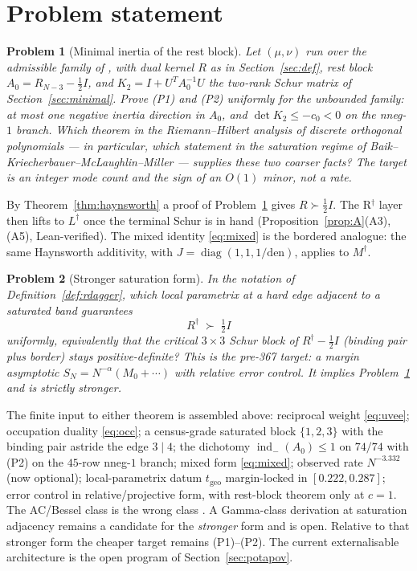 \documentclass[11pt]{article}
\newtheorem{problem}{Problem}
\theoremstyle{remark}
\newcommand{\Rd}{R^{\dagger}}
\newcommand{\Ld}{L^{\dagger}}
\newcommand{\half}{\tfrac12}
\begin{document}
\section{Problem statement}\label{sec:problem}

\begin{problem}[Minimal inertia of the rest block]
\label{prob:minimal}
Let $(\mu,\nu)$ run over the admissible family of
\cite{lstar-note}, with dual kernel $R$ as in
Section~\ref{sec:def}, rest block $A_{0}=R_{N-3}-\half I$, and
$K_{2}=I+U^{T}A_{0}^{-1}U$ the two-rank Schur matrix of
Section~\ref{sec:minimal}.  Prove \textup{(P1)} and \textup{(P2)}
uniformly for the unbounded family: at most one negative inertia
direction in $A_{0}$, and $\det K_{2}\le -c_{0}<0$ on the
nneg-$1$ branch.  Which theorem in the Riemann--Hilbert analysis
of discrete orthogonal polynomials --- in particular, which
statement in the saturation regime of
Baik--Kriecherbauer--McLaughlin--Miller
\emph{\cite[Thm~2.7, Remark~2.8]{BKMM2007}} --- supplies these two
coarser facts?  The target is an integer mode count and the sign
of an $O(1)$ minor, not a rate.
\end{problem}

By Theorem~\ref{thm:haynsworth} a proof of
Problem~\ref{prob:minimal} gives $R\succ\half I$.  The R$^{\dagger}$
layer then lifts to $\Ld$ once the terminal Schur is in hand
(Proposition~\ref{prop:A}(A3),(A5), Lean-verified).  The mixed
identity \eqref{eq:mixed} is the bordered analogue: the same
Haynsworth additivity, with $J=\operatorname{diag}(1,1,1/\mathrm{den})$,
applies to $M^{\dagger}$.

\begin{problem}[Stronger saturation form]
\label{prob:rhp}
In the notation of Definition~\ref{def:rdagger}, which local
parametrix at a hard edge adjacent to a saturated band guarantees
\begin{equation}\label{eq:target}
\Rd\;\succ\;\half I
\end{equation}
uniformly, equivalently that the critical $3\times3$ Schur block
of $\Rd-\half I$ (binding pair plus border) stays
positive-definite?  This is the pre-367 target: a margin
asymptotic $S_{N}=N^{-\alpha}(M_{0}+\cdots)$ with relative error
control.  It implies Problem~\ref{prob:minimal} and is strictly
stronger.
\end{problem}

The finite input to either theorem is assembled above: reciprocal
weight \eqref{eq:uvee}; occupation duality \eqref{eq:occ}; a
census-grade saturated block $\{1,2,3\}$ with the binding pair
astride the edge $3\mid4$; the dichotomy
$\operatorname{ind}_{-}(A_{0})\le1$ on $74/74$ with (P2) on the
$45$-row nneg-$1$ branch; mixed form \eqref{eq:mixed}; observed
rate $N^{-3.332}$ (now optional); local-parametrix datum
$t_{\mathrm{geo}}$ margin-locked in $[0.222,0.287]$; error
control in relative/projective form, with rest-block theorem only
at $c=1$.  The AC/Bessel class is the wrong class
\cite{Lubinsky2008}.  A Gamma-class derivation at saturation
adjacency remains a candidate for the \emph{stronger} form and is
open.  Relative to that stronger form the cheaper target remains
(P1)--(P2).  The current externalisable architecture is the
open program of Section~\ref{sec:potapov}.
\end{document}
